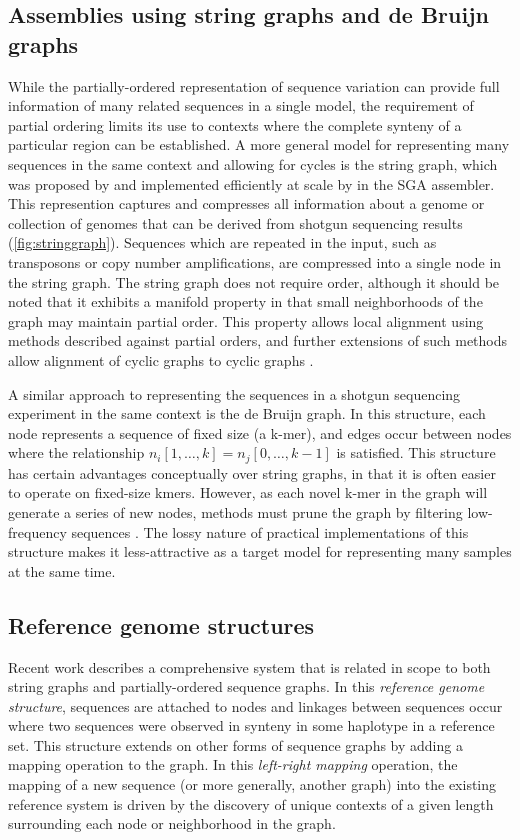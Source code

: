 \documentclass{article}
\begin{document}
\subsection{Assemblies using string graphs and de Bruijn graphs}

While the partially-ordered representation of sequence variation can provide full information of many related sequences in a single model, the requirement of partial ordering limits its use to contexts where the complete synteny of a particular region can be established. A more general model for representing many sequences in the same context and allowing for cycles is the string graph, which was proposed by \cite{myers2005} and implemented efficiently at scale by \cite{simpson2010} in the SGA assembler. This represention captures and compresses all information about a genome or collection of genomes that can be derived from shotgun sequencing results (\ref{fig:stringgraph}). Sequences which are repeated in the input, such as transposons or copy number amplifications, are compressed into a single node in the string graph. The string graph does not require order, although it should be noted that it exhibits a manifold property in that small neighborhoods of the graph may maintain partial order. This property allows local alignment using methods described against partial orders, and further extensions of such methods allow alignment of cyclic graphs to cyclic graphs \cite{myers1988}.

A similar approach to representing the sequences in a shotgun sequencing experiment in the same context is the de Bruijn graph. In this structure, each node represents a sequence of fixed size (a k-mer), and edges occur between nodes where the relationship $n_i[1,\ldots,k] = n_j[0,\ldots,k-1]$ is satisfied. This structure has certain advantages conceptually over string graphs, in that it is often easier to operate on fixed-size kmers. However, as each novel k-mer in the graph will generate a series of new nodes, methods must prune the graph by filtering low-frequency sequences \cite{iqbal}. The lossy nature of practical implementations of this structure makes it less-attractive as a target model for representing many samples at the same time.

\subsection{Reference genome structures}

Recent work \cite{paten2014} describes a comprehensive system that is related in scope to both string graphs and partially-ordered sequence graphs. In this \emph{reference genome structure}, sequences are attached to nodes and linkages between sequences occur where two sequences were observed in synteny in some haplotype in a reference set. This structure extends on other forms of sequence graphs by adding a mapping operation to the graph. In this \emph{left-right mapping} operation, the mapping of a new sequence (or more generally, another graph) into the existing reference system is driven by the discovery of unique contexts of a given length surrounding each node or neighborhood in the graph.
\end{document}
